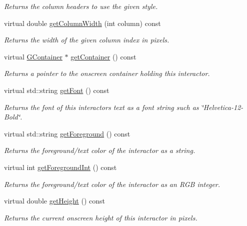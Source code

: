 \begin{DoxyCompactItemize}
\begin{DoxyCompactList}\small\item\em Returns the column headers to use the given style. \end{DoxyCompactList}\item 
virtual double \mbox{\hyperlink{classGTable_a4722043b7c3f968238968d3053b8a277}{get\+Column\+Width}} (int column) const
\begin{DoxyCompactList}\small\item\em Returns the width of the given column index in pixels. \end{DoxyCompactList}\item 
virtual \mbox{\hyperlink{classGContainer}{G\+Container}} $\ast$ \mbox{\hyperlink{classGInteractor_a7a6e317c29d61030929b4cd2d1c00fe7}{get\+Container}} () const
\begin{DoxyCompactList}\small\item\em Returns a pointer to the onscreen container holding this interactor. \end{DoxyCompactList}\item 
virtual std\+::string \mbox{\hyperlink{classGInteractor_a894a5502900794eeb27d084c21f1d77d}{get\+Font}} () const
\begin{DoxyCompactList}\small\item\em Returns the font of this interactor\textquotesingle{}s text as a font string such as \char`\"{}\+Helvetica-\/12-\/\+Bold\char`\"{}. \end{DoxyCompactList}\item 
virtual std\+::string \mbox{\hyperlink{classGInteractor_a4fa2d8b0192a3a5b4af4bbfe71194d03}{get\+Foreground}} () const
\begin{DoxyCompactList}\small\item\em Returns the foreground/text color of the interactor as a string. \end{DoxyCompactList}\item 
virtual int \mbox{\hyperlink{classGInteractor_ac3b12ab385a6ef9ae90fc879860ba726}{get\+Foreground\+Int}} () const
\begin{DoxyCompactList}\small\item\em Returns the foreground/text color of the interactor as an R\+GB integer. \end{DoxyCompactList}\item 
virtual double \mbox{\hyperlink{classGInteractor_a1e7e353362434072875264cf95629f99}{get\+Height}} () const
\begin{DoxyCompactList}\small\item\em Returns the current onscreen height of this interactor in pixels. \end{DoxyCompactList}\item 

\end{DoxyCompactItemize}
